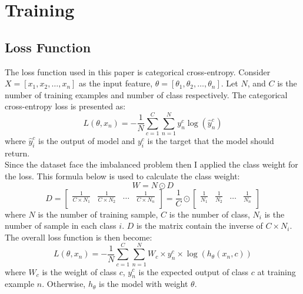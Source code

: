 \section{Training}
\subsection{Loss Function}
The loss function used in this paper is categorical cross-entropy. Consider $X = [x_1, x_2, \dots, x_n]$ as the input feature, $\theta = [\theta_1, \theta_2, \dots, \theta_n]$. Let $N$, and $C$ is the number of training examples and number of class respectively. The categorical cross-entropy loss is presented as:
\[L(\theta, x_n) = -\frac{1}{N}\sum_{c=1}^{C}\sum_{n=1}^{N}y^c_n\log(\hat{y}^c_n)\]
where $\hat{y}^c_i$  is the output of model and $y^c_i$ is the target that the model should return. \\
Since the dataset face the imbalanced problem then I applied the class weight for the loss. This formula below is used to calculate the class weight:
\[W = N \odot D\]
\[D = \begin{bmatrix}
	\frac{1}{C \times  N_1} & \frac{1}{C \times  N_2} & \dots & \frac{1}{C \times  N_n}\\
\end{bmatrix} = \frac{1}{C} \odot \begin{bmatrix}
\frac{1}{N_1} & \frac{1}{N_2} & \dots & \frac{1}{N_n}\\
\end{bmatrix}\]
where $N$ is the number of training sample, $C$ is the number of class, $N_i$ is the number of sample in each class $i$. $D$ is the matrix contain the inverse of $C \times N_i$. The overall loss function is then become\cite{8943952}:
\[
	L(\theta, x_n) = -\frac{1}{N}\sum_{c=1}^{C}\sum_{n=1}^{N} W_c \times y^c_n \times \log(h_\theta(x_n, c))
\]
where $W_c$ is the weight of class $c$, $y^c_n$ is the expected output of class $c$ at training example $n$. Otherwise, $h_\theta$ is the model with weight $\theta$.

